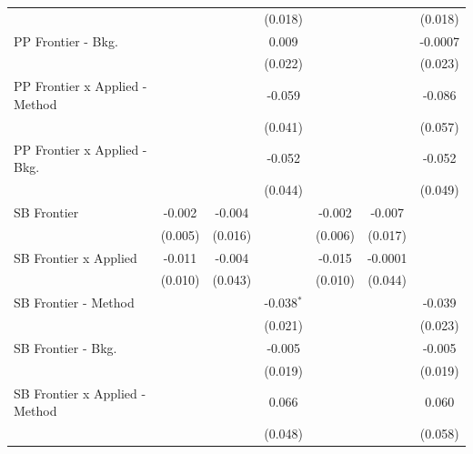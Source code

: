 \begin{tabular}{lcccccc}
                                  &              &             & (0.018)        &              &             & (0.018)\\   
   PP Frontier - Bkg.             &              &             & 0.009          &              &             & -0.0007\\   
                                  &              &             & (0.022)        &              &             & (0.023)\\   
   PP Frontier x Applied - Method &              &             & -0.059         &              &             & -0.086\\   
                                  &              &             & (0.041)        &              &             & (0.057)\\   
   PP Frontier x Applied - Bkg.   &              &             & -0.052         &              &             & -0.052\\   
                                  &              &             & (0.044)        &              &             & (0.049)\\   
   SB Frontier                    & -0.002       & -0.004      &                & -0.002       & -0.007      &   \\   
                                  & (0.005)      & (0.016)     &                & (0.006)      & (0.017)     &   \\   
   SB Frontier x Applied          & -0.011       & -0.004      &                & -0.015       & -0.0001     &   \\   
                                  & (0.010)      & (0.043)     &                & (0.010)      & (0.044)     &   \\   
   SB Frontier - Method           &              &             & -0.038$^{*}$   &              &             & -0.039\\   
                                  &              &             & (0.021)        &              &             & (0.023)\\   
   SB Frontier - Bkg.             &              &             & -0.005         &              &             & -0.005\\   
                                  &              &             & (0.019)        &              &             & (0.019)\\   
   SB Frontier x Applied - Method &              &             & 0.066          &              &             & 0.060\\   
                                  &              &             & (0.048)        &              &             & (0.058)\\   

\end{tabular}
